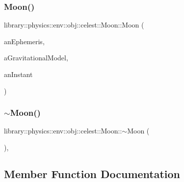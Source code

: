 \subsubsection{\texorpdfstring{Moon()}{Moon()}}
{\footnotesize\ttfamily library\+::physics\+::env\+::obj\+::celest\+::\+Moon\+::\+Moon (\begin{DoxyParamCaption}\item[{const Shared$<$ \hyperlink{classlibrary_1_1physics_1_1env_1_1_ephemeris}{Ephemeris} $>$ \&}]{an\+Ephemeris,  }\item[{const Shared$<$ \hyperlink{namespacelibrary_1_1physics_1_1env_1_1obj_1_1celest_ac63145c8cbe868bd79be8f6f423c8cf4}{Gravitational\+Model} $>$ \&}]{a\+Gravitational\+Model,  }\item[{const \hyperlink{classlibrary_1_1physics_1_1time_1_1_instant}{Instant} \&}]{an\+Instant }\end{DoxyParamCaption})}

\mbox{\label{classlibrary_1_1physics_1_1env_1_1obj_1_1celest_1_1_moon_aef4e99355b923e8c41ec12237bf41ecb}} 
\subsubsection{\texorpdfstring{$\sim$\+Moon()}{~Moon()}}
{\footnotesize\ttfamily library\+::physics\+::env\+::obj\+::celest\+::\+Moon\+::$\sim$\+Moon (\begin{DoxyParamCaption}{ }\end{DoxyParamCaption})\hspace{0.3cm}{\ttfamily [override]}, {\ttfamily [virtual]}}



\subsection{Member Function Documentation}
\mbox{\label{classlibrary_1_1physics_1_1env_1_1obj_1_1celest_1_1_moon_a9d922ab338809a6c1052edbe11ce3e60}} 
